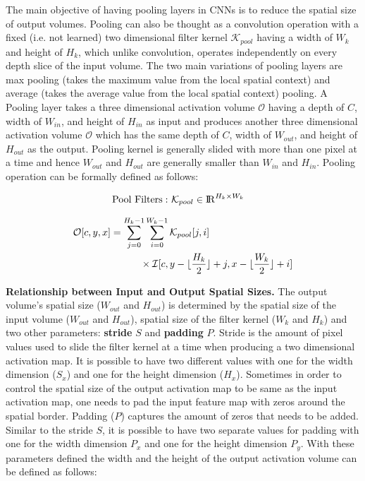 The main objective of having pooling layers in CNNs is to reduce the spatial size of output volumes. Pooling can also be thought as a convolution operation with a fixed (i.e. not learned) two dimensional filter kernel $\mathcal{K}_{pool}$ having a width of $W_k$ and height of $H_k$, which unlike convolution, operates independently on every depth slice of the input volume. The two main variations of pooling layers are max pooling (takes the maximum value from the local spatial context) and average (takes the average value from the local spatial context) pooling. A Pooling layer takes a three dimensional activation volume $\mathcal{O}$ having a depth of $C$, width of $W_{in}$, and height of $H_{in}$ as input and produces another three dimensional activation volume $\mathcal{O}$ which has the same depth of $C$, width of $W_{out}$, and height of $H_{out}$ as the output. Pooling kernel is generally slided with more than one pixel at a time and hence $W_{out}$ and $H_{out}$ are generally smaller than $W_{in}$ and $H_{in}$. Pooling operation can be formally defined as follows:

\vspace{-2mm}
\begin{align}
\text{Pool Filters}:&~ \mathcal{K}_{pool} \in \mathcal{\rm I\!R}^{H_{k} \times W_{k}}
\end{align}

\begin{equation}
\label{eqn:pool_operator}
\begin{split}
\mathcal{O}[c,y,x] &= \sum_{j=0}^{H_k-1} \sum_{i=0}^{W_k-1} \mathcal{K}_{pool}[j, i] \\ & \quad \quad \quad \times \mathcal{I}[c,y-\lfloor\frac{H_k}{2}\rfloor+j,x-\lfloor\frac{W_k}{2}\rfloor+i]
\end{split}
\end{equation}


\noindent \textbf{Relationship between Input and Output Spatial Sizes.} The output volume's spatial size ($W_{out}$ and $H_{out}$) is determined by the spatial size of the input volume ($W_{out}$ and $H_{out}$), spatial size of the filter kernel ($W_k$ and $H_k$) and two other parameters: \textbf{stride} $S$ and \textbf{padding} $P$. Stride is the amount of pixel values used to slide the filter kernel at a time when producing a two dimensional activation map. It is possible to have two different values with one for the width dimension ($S_x$) and one for the height dimension ($H_x$). Sometimes in order to control the spatial size of the output activation map to be same as the input activation map, one needs to pad the input feature map with zeros around the spatial border. Padding ($P$) captures the amount of zeros that needs to be added. Similar to the stride $S$, it is possible to have two separate values for padding with one for the width dimension $P_x$ and one for the height dimension $P_y$. With these parameters defined the width and the height of the output activation volume can be defined as follows:

